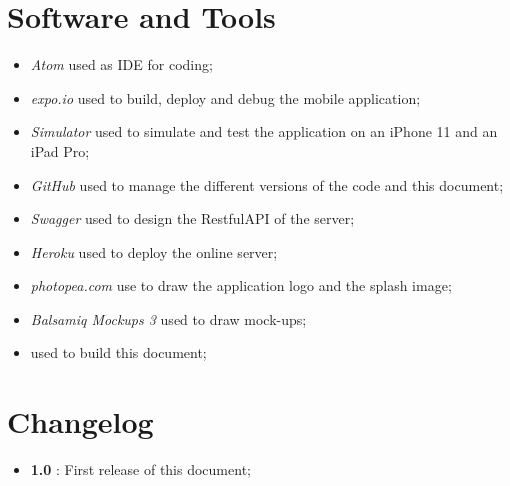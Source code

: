 \section{Software and Tools}
\begin{itemize}
  \item \textit{Atom} used as IDE for coding;
  \item \textit{expo.io} used to build, deploy and debug the mobile application;
  \item \textit{Simulator} used to simulate and test the application on an iPhone 11 and an iPad Pro;
  \item \textit{GitHub} used to manage the different versions of the code and this document;
  \item \textit{Swagger} used to design the RestfulAPI of the server;
  \item \textit{Heroku} used to deploy the online server;
  \item \textit{photopea.com} use to draw the application logo and the splash image;
  \item \textit{Balsamiq Mockups 3} used to draw mock-ups;
  \item \text{\LaTeX} used to build this document;
\end{itemize}


\section{Changelog} \label{Changelog}
\begin{itemize}
  \item \textbf{1.0} : First release of this document;
\end{itemize}